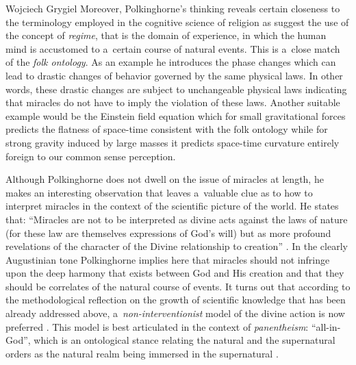 \begin{artengenv}{Wojciech Grygiel}
{}
Moreover, Polkinghorne’s thinking reveals certain closeness to the terminology employed in the cognitive science of religion as suggest the use of the concept of \textit{regime}, that is the domain of experience, in which the human mind is accustomed to a~certain course of natural events. This is a~close match of the \textit{folk ontology}. As an example he introduces the phase changes which can lead to drastic changes of behavior governed by the same physical laws. In other words, these drastic changes are subject to unchangeable physical laws indicating that miracles do not have to imply the violation of these laws. Another suitable example would be the Einstein field equation which for small gravitational forces predicts the flatness of space-time consistent with the folk ontology while for strong gravity induced by large masses it predicts space-time curvature entirely foreign to our common sense perception.

Although Polkinghorne does not dwell on the issue of miracles at length, he makes an interesting observation that leaves a~valuable clue as to how to interpret miracles in the context of the scientific picture of the world. He states that: ``Miracles are not to be interpreted as divine acts against the laws of nature (for these law are themselves expressions of God’s will) but as more profound revelations of the character of the Divine relationship to creation''
\parencite[][p.93]{polkinghorne_science_1998}. %
 In the clearly Augustinian tone Polkinghorne implies here that miracles should not infringe upon the deep harmony that exists between God and His creation and that they should be correlates of the natural course of events. It turns out that according to the methodological reflection on the growth of scientific knowledge that has been already addressed above, a~\textit{non-interventionist} model of the divine action is now preferred 
\parencite[e.g.][pp.117–121]{heller_sens_2002}. %
 This model is best articulated in the context of \textit{panentheism}: ``all-in-God'', which is an ontological stance relating the natural and the supernatural orders as the natural realm being immersed in the supernatural 
\parencite[e.g.][]{clayton_whom_2004}.%



\end{artengenv}
